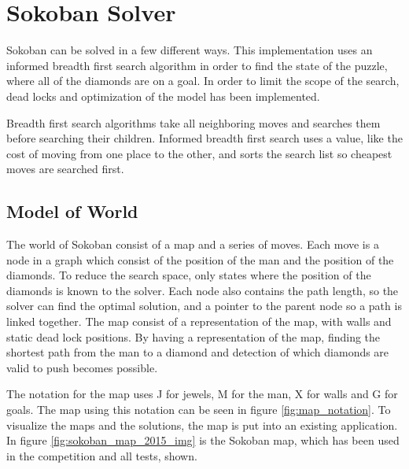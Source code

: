 \section{Sokoban Solver}
Sokoban can be solved in a few different ways. 
This implementation uses an informed breadth first search algorithm in order to find the state of the puzzle, where all of the diamonds are on a goal.
In order to limit the scope of the search, dead locks and optimization of the model has been implemented.

Breadth first search algorithms take all neighboring moves and searches them before searching their children.
Informed breadth first search uses a value, like the cost of moving from one place to the other, and sorts the search list so cheapest moves are searched first.

\subsection{Model of World}
The world of Sokoban consist of a map and a series of moves.
Each move is a node in a graph which consist of the position of the man and the position of the diamonds.
To reduce the search space, only states where the position of the diamonds is known to the solver.
Each node also contains the path length, so the solver can find the optimal solution, and a pointer to the parent node so a path is linked together.
The map consist of a representation of the map, with walls and static dead lock positions.
By having a representation of the map, finding the shortest path from the man to a diamond and detection of which diamonds are valid to push becomes possible.

The notation for the map uses J for jewels, M for the man, X for walls and G for goals.
The map using this notation can be seen in figure \ref{fig:map_notation}.
To visualize the maps and the solutions, the map is put into an existing application\cite{url:qml-sokoban}.
In figure \ref{fig:sokoban_map_2015_img} is the Sokoban map, which has been used in the competition and all tests, shown.

